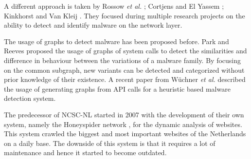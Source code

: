 A different approach is taken by Rossow \textit{et al.} \cite{Rossow2011}; Cortjens and El Yassem \cite{Cortjens2012}; Kinkhorst and Van Kleij \cite{Kinkhorst2009}. They focused during multiple research projects on the ability to detect and identify malware on the network layer.

The usage of graphs to detect malware has been proposed before. Park and Reeves proposed\cite{Park2011} the usage of graphs of system calls to detect the similarities and difference in behaviour between the variations of a malware family. By focusing on the common subgraph, new variants can be detected and categorized without prior knowledge of their existence. A recent paper\cite{Wuchner2014} from W\"{u}chner \textit{et al.} described the usage of generating graphs from API calls for a heuristic based malware detection system.

The predecessor of NCSC-NL started in 2007 with the development of their own system, namely the Honeyspider network \cite{honeyspider}, for the dynamic analysis of websites. This system crawled the biggest and most important websites of the Netherlands on a daily base. The downside of this system is that it requires a lot of maintenance and hence it started to become outdated.

\iffalse
\subsection{Scope}

\todo{Zelfstandiger maken}

In this research project is an an algorithm created that allows multiple URLs to be opened at the same time while still being able to track all further interaction, such as unexpected HTTP requests and other malicious activity, and link them to the original request/URL. To prove that the algorithm is something feasible, a proof of concept of the algorithm has been implemented on top of the Cuckoo Sandbox.

The goal during this research project was to make the algorithm fully platform agnostic, however, several technical challenges prevented this. For this reason we limited our self to Windows 7 with version 8 of the Internet Explorer browser and have we the identified issues described.

The detection and identification of malicious behaviour was not part of this project. For our PoC we sticked to the detection of a well-known older and still to be determined malware family which existence is easy to detect on the system. 

\subsection{Ethical issues}

Our research contains no major ethical issues as it does not include working with personally identifiable information. Malware, if any, will be run in a controlled virtual environment. After every testrun the virtual machine will be automatically destroyed.

\fi
